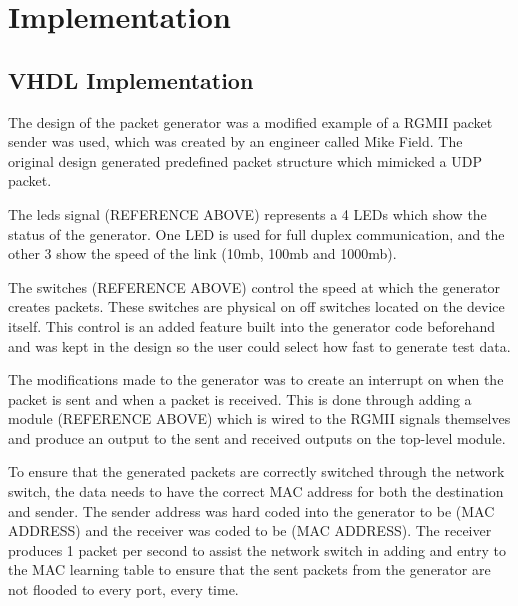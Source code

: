 \chapter{Implementation}\label{C:impl}

\section{VHDL Implementation}

The design of the packet generator was a modified example of a RGMII packet sender was used, which was created by an 
engineer called Mike Field. The original design generated predefined packet structure which mimicked a UDP packet. 



The leds signal (REFERENCE ABOVE) represents a 4 LEDs which show the status of the generator. One LED is used for 
full duplex communication, and the other 3 show the speed of the link (10mb, 100mb and 1000mb). 



The switches (REFERENCE ABOVE) control the speed at which the generator creates packets. These switches are physical 
on off switches located on the device itself.  This control is an added feature built into the generator code 
beforehand and was kept in the design so the user could select how fast to generate test data.



The modifications made to the generator was to create an interrupt on when the packet is sent and when a packet is 
received. This is done through adding a module (REFERENCE ABOVE) which is wired to the RGMII signals themselves and 
produce an output to the sent and received outputs on the top-level module.



To ensure that the generated packets are correctly switched through the network switch, the data needs to have the 
correct MAC address for both the destination and sender. The sender address was hard coded into the generator to be 
(MAC ADDRESS) and the receiver was coded to be (MAC ADDRESS). The receiver produces 1 packet per second to assist 
the network switch in adding and entry to the MAC learning table to ensure that the sent packets from the generator 
are not flooded to every port, every time. 

